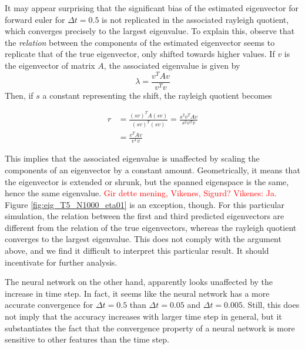 \documentclass[12pt]{extarticle}
\begin{document}
It may appear surprising that the significant bias of the estimated eigenvector for forward euler for $\Delta t =0.5$ is not replicated in the associated rayleigh quotient, which converges precisely to the largest eigenvalue. To explain this, observe that the \textit{relation} between the components of the estimated eigenvector seems to replicate that of the true eigenvector, only shifted towards higher values. If $v$ is the eigenvector of matrix $A$, the associated eigenvalue is given by
\[ \lambda = \frac{v^T A v}{v^T v} \]
Then, if $s$ a constant representing the shift, the rayleigh quotient becomes

\begin{align*}
	r &= \frac{(sv)^T A (sv)}{(sv)^T (sv)} = \frac{s^2 v^T A v}{s^2 v^T v} \\
	&= \frac{v^T A v}{v^T v}
\end{align*}

This implies that the associated eigenvalue is unaffected by scaling the components of an eigenvector by a constant amount. Geometrically, it means that the eigenvector is extended or shrunk, but the spanned eigenspace is the same, hence the same eigenvalue. \textcolor{red}{Gir dette mening, Vikenes, Sigurd? Vikenes: Ja.} Figure \ref{fig:eig_T5_N1000_eta01} is an exception, though. For this particular simulation, the relation between the first and third predicted eigenvectors are different from the relation of the true eigenvectors, whereas the rayleigh quotient converges to the largest eigenvalue. This does not comply with the argument above, and we find it difficult to interpret this particular result. It should incentivate for further analysis.

The neural network on the other hand, apparently looks unaffected by the increase in time step. In fact, it seems like the neural network has a more accurate convergence for $\Delta t = 0.5$ than $\Delta t = 0.05$ and $\Delta t = 0.005$. Still, this does not imply that the accuracy increases with larger time step in general, but it substantiates the fact that the convergence property of a neural network is more sensitive to other features than the time step. 
\end{document}
